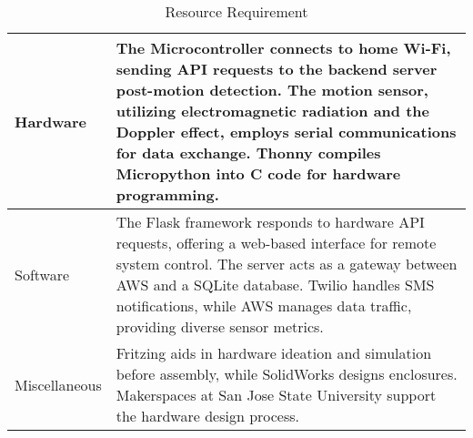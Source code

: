 \begin{table}[htbp]
    \begin{center}
        \begin{tabular}{p{0.2\linewidth}p{0.8\linewidth}}
            \midrule
            Hardware & The Microcontroller connects to home Wi-Fi, sending API requests to the backend server post-motion detection. The motion sensor, utilizing electromagnetic radiation and the Doppler effect, employs serial communications for data exchange. Thonny compiles Micropython into C code for hardware programming.
            \\
            \midrule
            Software & The Flask framework responds to hardware API requests, offering a web-based interface for remote system control. The server acts as a gateway between AWS and a SQLite database. Twilio handles SMS notifications, while AWS manages data traffic, providing diverse sensor metrics.
            \\
            \midrule
            Miscellaneous & Fritzing aids in hardware ideation and simulation before assembly, while SolidWorks designs enclosures. Makerspaces at San Jose State University support the hardware design process. \\
            \midrule
        \end{tabular}
    
        \label{tab1}
    \end{center}
    \caption{Resource Requirement}
\end{table}